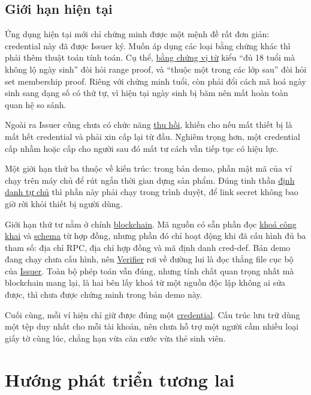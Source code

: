 \documentclass[a4paper,11pt,oneside]{report}
\theoremstyle{definition}
\theoremstyle{plain}
\newcommand{\g}[2]{\hyperref[term:#1]{#2}}
\begin{document}
\section{Giới hạn hiện tại}
\label{sec:limits}

Ứng dụng hiện tại mới chỉ chứng minh được một mệnh đề rất đơn giản: credential
này đã được Issuer ký. Muốn áp dụng các loại bằng chứng khác thì phải thêm thuật toán
tính toán. Cụ thể, \g{predicate}{bằng chứng vị từ} kiểu ``đủ 18 tuổi mà không lộ ngày sinh'' đòi
hỏi range proof, và ``thuộc một trong các lớp sau'' đòi hỏi set membership proof. Riêng với chứng
minh tuổi, còn phải đổi cách mã hoá ngày sinh sang dạng số có thứ tự, vì hiện tại ngày sinh bị
băm nên mất hoàn toàn quan hệ so sánh.

Ngoài ra Issuer cũng chưa có chức năng \g{revocation}{thu hồi}, khiến cho nếu mất thiết bị là mất
hết credential và phải xin cấp lại từ đầu. Nghiêm trọng hơn, một credential cấp nhầm hoặc cấp cho
người sau đó mất tư cách vẫn tiếp tục có hiệu lực.

Một giới hạn thứ ba thuộc về kiến trúc: trong bản demo, phần mật mã của ví chạy trên máy chủ để
rút ngắn thời gian dựng sản phẩm. Đúng tinh thần \g{ssi}{định danh tự chủ} thì phần này phải chạy
trong trình duyệt, để link secret không bao giờ rời khỏi thiết bị người dùng.

Giới hạn thứ tư nằm ở chính \g{blockchain}{blockchain}. Mã nguồn có sẵn phần đọc
\g{pubkey}{khoá công khai} và \g{schema}{schema} từ hợp đồng, nhưng phần đó chỉ hoạt động khi
đã cấu hình đủ ba tham số: địa chỉ RPC, địa chỉ hợp đồng và mã định danh cred-def. Bản demo đang
chạy chưa cấu hình, nên \g{verifier}{Verifier} rơi về đường lui là đọc thẳng file cục bộ của
\g{issuer}{Issuer}. Toàn bộ phép toán vẫn đúng, nhưng tính chất quan trọng nhất mà blockchain
mang lại, là hai bên lấy khoá từ một nguồn độc lập không ai sửa được, thì chưa được chứng minh
trong bản demo này.

Cuối cùng, mỗi ví hiện chỉ giữ được đúng một \g{credential}{credential}. Cấu trúc lưu trữ dùng
một tệp duy nhất cho mỗi tài khoản, nên chưa hỗ trợ một người cầm nhiều loại giấy tờ cùng lúc,
chẳng hạn vừa căn cước vừa thẻ sinh viên.

\chapter{Hướng phát triển tương lai}
\end{document}
